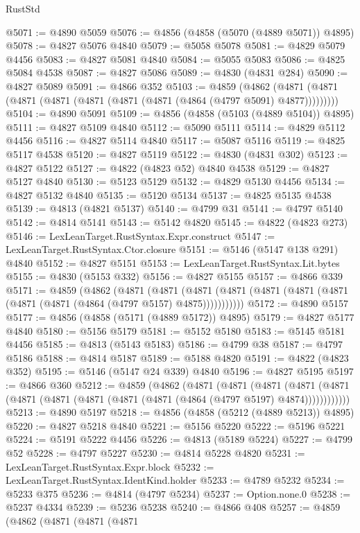 \begin{lexlean}{RustStd}
\begin{coremodule}
@5071 := @4890 @5059
@5076 := @4856 (@4858 (@5070 (@4889 @5071)) @4895)
@5078 := @4827 @5076 @4840
@5079 := @5058 @5078
@5081 := @4829 @5079 @4456
@5083 := @4827 @5081 @4840
@5084 := @5055 @5083
@5086 := @4825 @5084 @4538
@5087 := @4827 @5086
@5089 := @4830 (@4831 @284)
@5090 := @4827 @5089
@5091 := @4866 @352
@5103 := @4859
    (@4862 (@4871 (@4871 (@4871 (@4871 (@4871 (@4871 (@4871 (@4864 (@4797 @5091) @4877)))))))))
@5104 := @4890 @5091
@5109 := @4856 (@4858 (@5103 (@4889 @5104)) @4895)
@5111 := @4827 @5109 @4840
@5112 := @5090 @5111
@5114 := @4829 @5112 @4456
@5116 := @4827 @5114 @4840
@5117 := @5087 @5116
@5119 := @4825 @5117 @4538
@5120 := @4827 @5119
@5122 := @4830 (@4831 @302)
@5123 := @4827 @5122
@5127 := @4822 (@4823 @52) @4840 @4538
@5129 := @4827 @5127 @4840
@5130 := @5123 @5129
@5132 := @4829 @5130 @4456
@5134 := @4827 @5132 @4840
@5135 := @5120 @5134
@5137 := @4825 @5135 @4538
@5139 := @4813 (@4821 @5137)
@5140 := @4799 @31
@5141 := @4797 @5140
@5142 := @4814 @5141
@5143 := @5142 @4820
@5145 := @4822 (@4823 @273)
@5146 := LexLeanTarget.RustSyntax.Expr.construct
@5147 := LexLeanTarget.RustSyntax.Ctor.closure
@5151 := @5146 (@5147 @138 @291) @4840
@5152 := @4827 @5151
@5153 := LexLeanTarget.RustSyntax.Lit.bytes
@5155 := @4830 (@5153 @332)
@5156 := @4827 @5155
@5157 := @4866 @339
@5171 := @4859
    (@4862
      (@4871
        (@4871
          (@4871 (@4871 (@4871 (@4871 (@4871 (@4871 (@4871 (@4864 (@4797 @5157) @4875)))))))))))
@5172 := @4890 @5157
@5177 := @4856 (@4858 (@5171 (@4889 @5172)) @4895)
@5179 := @4827 @5177 @4840
@5180 := @5156 @5179
@5181 := @5152 @5180
@5183 := @5145 @5181 @4456
@5185 := @4813 (@5143 @5183)
@5186 := @4799 @38
@5187 := @4797 @5186
@5188 := @4814 @5187
@5189 := @5188 @4820
@5191 := @4822 (@4823 @352)
@5195 := @5146 (@5147 @24 @339) @4840
@5196 := @4827 @5195
@5197 := @4866 @360
@5212 := @4859
    (@4862
      (@4871
        (@4871
          (@4871
            (@4871 (@4871 (@4871 (@4871 (@4871 (@4871 (@4871 (@4864 (@4797 @5197) @4874))))))))))))
@5213 := @4890 @5197
@5218 := @4856 (@4858 (@5212 (@4889 @5213)) @4895)
@5220 := @4827 @5218 @4840
@5221 := @5156 @5220
@5222 := @5196 @5221
@5224 := @5191 @5222 @4456
@5226 := @4813 (@5189 @5224)
@5227 := @4799 @52
@5228 := @4797 @5227
@5230 := @4814 @5228 @4820
@5231 := LexLeanTarget.RustSyntax.Expr.block
@5232 := LexLeanTarget.RustSyntax.IdentKind.holder
@5233 := @4789 @5232
@5234 := @5233 @375
@5236 := @4814 (@4797 @5234)
@5237 := Option.none.{0}
@5238 := @5237 @4334
@5239 := @5236 @5238
@5240 := @4866 @408
@5257 := @4859
    (@4862
      (@4871
        (@4871
          (@4871

\end{coremodule}
\end{lexlean}
